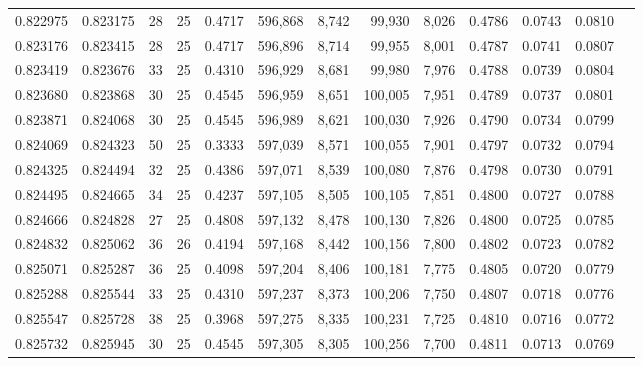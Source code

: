 \begin{tabular}{rrrrrrrrrrrrr}
0.822975 & 0.823175 &    28 &  25 &                                     0.4717 & 596,868 &   8,742 &  99,930 &   8,026 & 0.4786 & 0.0743 & 0.0810 \\
0.823176 & 0.823415 &    28 &  25 &                                     0.4717 & 596,896 &   8,714 &  99,955 &   8,001 & 0.4787 & 0.0741 & 0.0807 \\
0.823419 & 0.823676 &    33 &  25 &                                     0.4310 & 596,929 &   8,681 &  99,980 &   7,976 & 0.4788 & 0.0739 & 0.0804 \\
0.823680 & 0.823868 &    30 &  25 &                                     0.4545 & 596,959 &   8,651 & 100,005 &   7,951 & 0.4789 & 0.0737 & 0.0801 \\
0.823871 & 0.824068 &    30 &  25 &                                     0.4545 & 596,989 &   8,621 & 100,030 &   7,926 & 0.4790 & 0.0734 & 0.0799 \\
0.824069 & 0.824323 &    50 &  25 &                                     0.3333 & 597,039 &   8,571 & 100,055 &   7,901 & 0.4797 & 0.0732 & 0.0794 \\
0.824325 & 0.824494 &    32 &  25 &                                     0.4386 & 597,071 &   8,539 & 100,080 &   7,876 & 0.4798 & 0.0730 & 0.0791 \\
0.824495 & 0.824665 &    34 &  25 &                                     0.4237 & 597,105 &   8,505 & 100,105 &   7,851 & 0.4800 & 0.0727 & 0.0788 \\
0.824666 & 0.824828 &    27 &  25 &                                     0.4808 & 597,132 &   8,478 & 100,130 &   7,826 & 0.4800 & 0.0725 & 0.0785 \\
0.824832 & 0.825062 &    36 &  26 &                                     0.4194 & 597,168 &   8,442 & 100,156 &   7,800 & 0.4802 & 0.0723 & 0.0782 \\
0.825071 & 0.825287 &    36 &  25 &                                     0.4098 & 597,204 &   8,406 & 100,181 &   7,775 & 0.4805 & 0.0720 & 0.0779 \\
0.825288 & 0.825544 &    33 &  25 &                                     0.4310 & 597,237 &   8,373 & 100,206 &   7,750 & 0.4807 & 0.0718 & 0.0776 \\
0.825547 & 0.825728 &    38 &  25 &                                     0.3968 & 597,275 &   8,335 & 100,231 &   7,725 & 0.4810 & 0.0716 & 0.0772 \\
0.825732 & 0.825945 &    30 &  25 &                                     0.4545 & 597,305 &   8,305 & 100,256 &   7,700 & 0.4811 & 0.0713 & 0.0769 \\

\end{tabular}
